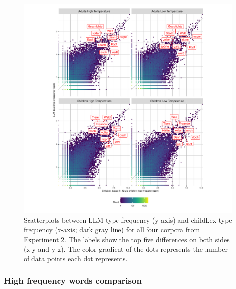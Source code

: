 \documentclass[doc, a4paper]{apa7}
\begin{document}
\begin{figure}[!htbp]
  \centerline{
    \includegraphics[scale=.7]{figures/scatterplotfacets.pdf}}
    \caption{Scatterplots between LLM type frequency (y-axis) and childLex type frequency (x-axis; dark gray line) for all four corpora from Experiment 2. The labels show the top five differences on both sides (x-y and y-x). The color gradient of the dots represents the number of data points each dot represents.}
    \label{fig:scatterplotfacets}
\end{figure}

\clearpage


\subsubsection{High frequency words comparison}
\end{document}
